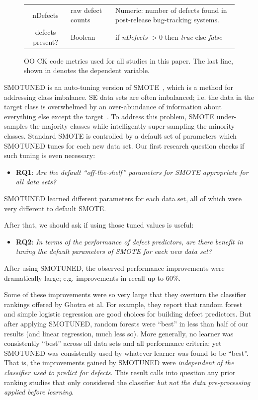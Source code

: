 \documentclass[10pt,conference]{IEEEtran}
\newcommand{\bi}{\begin{itemize}[leftmargin=0.4cm]}
\newcommand{\ei}{\end{itemize}}
\theoremstyle{break}
\theoremstyle{break}
\newcommand{\smb}{{\sc SMOTUNED}}
\begin{document}
\begin{figure}[!t]
\begin{center}
{\begin{tabular}{c|l|p{4.0in}}
nDefects & raw defect counts & Numeric: number of defects found in post-release bug-tracking systems.\\
\rowcolor{lightgray}
defects present? & Boolean& if {\em nDefects} $>0$ then {\em true} else {\em false}
\end{tabular}
}
\end{center}
\caption{OO CK code metrics used for all studies in this paper.
The last line, shown in \textcolor{gray} denotes the dependent variable.}
\label{fig:ck}
\vspace{-0.7cm}
\end{figure}


SMOTUNED is an auto-tuning version of  SMOTE~\cite{chawla2003smoteboost}, which is
a method for addressing class imbalance. SE data
sets are often imbalanced; i.e. the data in the target class is overwhelmed by an over-abundance of information about everything else except the target~\cite{menzies2007problems}. To
address this problem, SMOTE under-samples
the majority classes while intelligently super-sampling  the minority classes. Standard
SMOTE is controlled by a default
set of parameters which SMOTUNED tunes 
for each new data set. 
Our first research question
checks if such tuning is even necessary:
 \bi
 \item
  \textbf{RQ1}:  {\em Are the default ``off-the-shelf'' parameters for SMOTE appropriate for
  all data sets?} 
  \ei
 \begin{lesson}SMOTUNED learned different parameters for each data set, all of which  were very different to default SMOTE.
 \end{lesson}
After that, we should ask if using those
tuned values is useful:
  \bi
  \item
  \textbf{RQ2}: {\em In terms of the performance of defect predictors,
  are  there benefit in tuning the default parameters of SMOTE for
  each new data set?} 
  \ei
   \begin{lesson}After using SMOTUNED, the observed performance improvements were dramatically large; e.g. improvements in recall  up to 60\%.
 \end{lesson}
Some of these improvements were so very large that they overturn
the classifier rankings offered by Ghotra et al. For example,
they report that   random forest  and simple logistic
regression are good choices for building defect predictors.
But after  applying  SMOTUNED, random forests were ``best'' in less
than half of  our results (and linear regression, much less so).
More generally,  no learner was consistently ``best'' across all data sets and all performance criteria; yet {\smb} was consistently  used by  whatever  learner was found to be ``best''. 
That is,  the improvements gained by
{\smb} were  {\em  independent of the  classifier used to
predict for defects}.
This  result calls into question any prior ranking studies that  only considered the classifier {\em but not the data pre-processing applied before learning}.   
  
\end{document}
